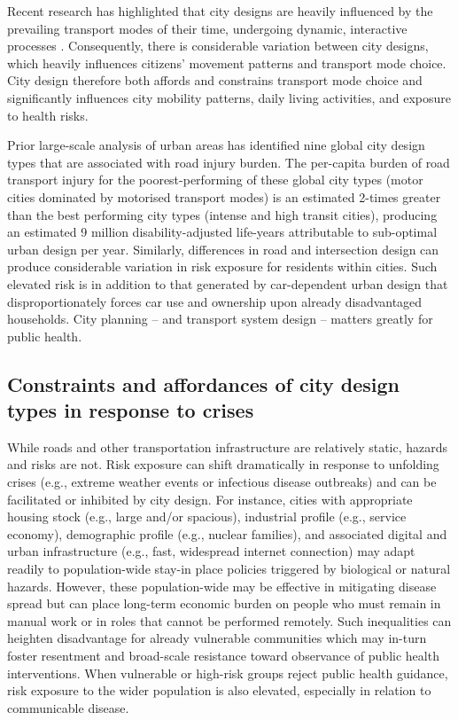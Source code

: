 \documentclass[preprint,10pt]{elsarticle} %
\begin{document}
Recent research has highlighted that city designs are heavily influenced by the prevailing transport modes of their time\cite{KNOWLES2020102607}, undergoing dynamic, interactive processes \cite{Strano2012}. Consequently, there is considerable variation between city designs, which heavily influences citizens' movement patterns and transport mode choice\cite{Thompson2020}. City design therefore both affords and constrains transport mode choice and significantly influences city mobility patterns, daily living activities, and exposure to health risks\cite{WHO2023}.

Prior large-scale analysis of urban areas has identified nine global city design types that are associated with road injury burden\cite{Thompson2020}. The per-capita burden of road transport injury for the poorest-performing of these global city types (motor cities dominated by motorised transport modes) is an estimated 2-times greater than the best performing city types (intense and high transit cities), producing an estimated 9 million disability-adjusted life-years attributable to sub-optimal urban design per year\cite{Thompson2020}. Similarly, differences in road and intersection design can produce considerable variation in risk exposure for residents within cities\cite{Wijnands_IntersectionDesign2021,MORRISON2019123}. Such elevated risk is in addition to that generated by car-dependent urban design that disproportionately forces car use and ownership upon already disadvantaged households\cite{currie2018alarming, CURL201861}. City planning -- and transport system design -- matters greatly for public health.



\subsection*{Constraints and affordances of city design types in response to crises}
While roads and other transportation infrastructure are relatively static, hazards and risks are not. Risk exposure can shift dramatically in response to unfolding crises (e.g., extreme weather events or infectious disease outbreaks) and can be facilitated or inhibited by city design. For instance, cities with appropriate housing stock (e.g., large and/or spacious), industrial profile (e.g., service economy), demographic profile (e.g., nuclear families), and associated digital and urban infrastructure (e.g., fast, widespread internet connection) may adapt readily to population-wide stay-in place policies triggered by biological or natural hazards\cite{hale2021global}. However, these population-wide may be effective in mitigating disease spread but can place long-term economic burden on people who must remain in manual work or in roles that cannot be performed remotely\cite{CraigWFH,Vyas2021}. Such inequalities can heighten disadvantage for already vulnerable communities\cite{martin2020fighting} which may in-turn foster resentment and broad-scale resistance toward observance of public health interventions\cite{de2016sustainability}. When vulnerable or high-risk groups reject public health guidance, risk exposure to the wider population is also elevated, especially in relation to communicable disease\cite{koopman2005control}.
\end{document}
